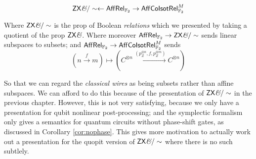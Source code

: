 $$\mathsf{ZX}\textit{\&}/\sim \leftarrow \mathsf{Aff}\mathsf{Rel}_{\mathbb{F}_2} \rightarrow \mathsf{Aff}{\sf Co}{\sf Isot}\mathsf{Rel}_{\mathbb{F}_2}^M$$


Where $\mathsf{ZX}\textit{\&}/\sim$ is the prop of Boolean {\em relations} which we presented by taking a quotient of the prop $\mathsf{ZX}\textit{\&}$.
Where moreover  $\mathsf{Aff}\mathsf{Rel}_{\mathbb{F}_2}\to \mathsf{ZX}\textit{\&}/\sim$ sends linear subspaces to subsets; and  $\mathsf{Aff}\mathsf{Rel}_{\mathbb{F}_2} \to \mathsf{Aff}{\sf Co}{\sf Isot}\mathsf{Rel}_{\mathbb{F}_2}^M$  sends 
$$(n\xrightarrow{f} m) \mapsto (C^{\otimes n}\xrightarrow{(p_Z^{\otimes n}, f, p_Z^{\otimes m})} C^{\otimes n})$$

So that we can regard the {\em classical wires} as being subsets rather than affine subspaces.
We can afford to do this because of the presentation of $\mathsf{ZX}\textit{\&}/\sim$ in the previous chapter. However, this is not very satisfying, because we only have a presentation for qubit nonlinear post-processing; and the symplectic formalism only gives a semantics for quantum circuits without phase-shift gates, as discussed in Corollary \ref{cor:nophase}.   This gives more motivation to actually work out a presentation for the quopit version of $\mathsf{ZX}\textit{\&}/\sim$ where there is no such subtlely.


